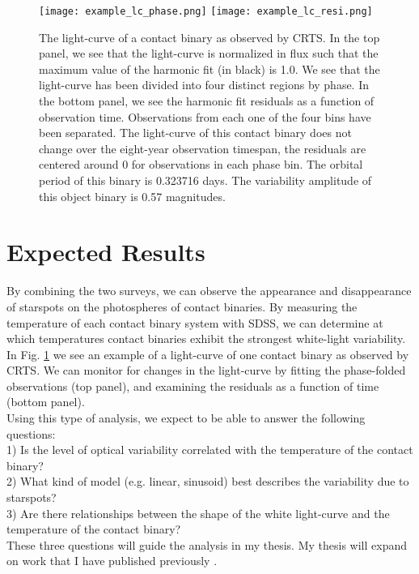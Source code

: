 \documentclass[11pt, oneside]{article}   	%
\begin{document}
\begin{figure}
\texttt{[image: example\_lc\_phase.png]}
\texttt{[image: example\_lc\_resi.png]}
\caption{The light-curve of a contact binary as observed by CRTS. In the top panel, we see that the light-curve is normalized in flux such that the maximum value of the harmonic fit (in black) is 1.0. We see that the light-curve has been divided into four distinct regions by phase. In the bottom panel, we see the harmonic fit residuals as a function of observation time. Observations from each one of the four bins have been separated. The light-curve of this contact binary does not change over the eight-year observation timespan, the residuals are centered around 0 for observations in each phase bin. The orbital period of this binary is 0.323716 days. The variability amplitude of this object binary is 0.57 magnitudes.}
\label{lc_label}
\end{figure}

\section{Expected Results}

By combining the two surveys, we can observe the appearance and disappearance of starspots on the photospheres of contact binaries. By measuring the temperature of each contact binary system with SDSS, we can determine at which temperatures contact binaries exhibit the strongest white-light variability. In Fig. \ref{lc_label} we see an example of a light-curve of one contact binary as observed by CRTS. We can monitor for changes in the light-curve by fitting the phase-folded observations (top panel), and examining the residuals as a function of time (bottom panel). \\

Using this type of analysis, we expect to be able to answer the following questions: \\

1) Is the level of optical variability correlated with the temperature of the contact binary? \\

2) What kind of model (e.g. linear, sinusoid) best describes the variability due to starspots? \\

3) Are there relationships between the shape of the white light-curve and the temperature of the contact binary? \\

These three questions will guide the analysis in my thesis. My thesis will expand on work that I have published previously \citep{marsh2016characterization}.



\end{document}
